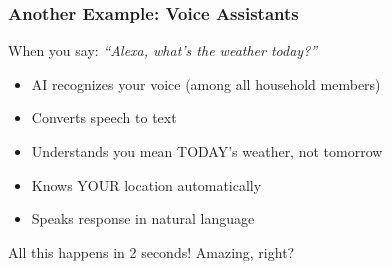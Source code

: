 \begin{frame}[fragile]\frametitle{Another Example: Voice Assistants}

When you say: {\em ``Alexa, what's the weather today?''}

\begin{itemize}
\item AI recognizes your voice (among all household members)
\item Converts speech to text
\item Understands you mean TODAY's weather, not tomorrow
\item Knows YOUR location automatically
\item Speaks response in natural language
\end{itemize}

All this happens in 2 seconds! Amazing, right?
\end{frame}


%
%
%

